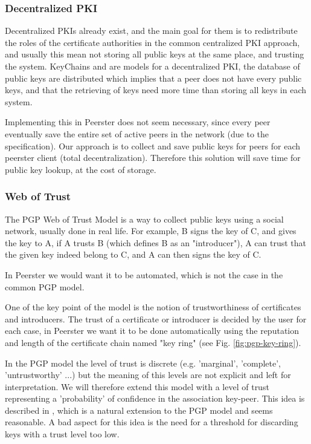 \documentclass[]{article}
\begin{document}
\subsubsection{Decentralized PKI}
Decentralized PKIs already exist, and the main goal for them is to redistribute the roles of the certificate authorities in the common centralized PKI approach, and usually this mean not storing all public keys at the same place, and trusting the system. KeyChains \cite{morselli2006keychains} and \cite{aberer2005decentralised} are models for a decentralized PKI, the database of public keys are distributed which implies that a peer does not have every public keys, and that the retrieving of keys need more time than storing all keys in each system.

Implementing this in Peerster does not seem necessary, since every peer eventually save the entire set of active peers in the network (due to the specification). Our approach is to collect and save public keys for peers for each peerster client (total decentralization). Therefore this solution will save time for public key lookup, at the cost of storage.

\subsubsection{Web of Trust}
\label{sec:related-work-wot}

The PGP Web of Trust Model \cite{abdul1997pgp} is a way to collect public keys using a social network, usually done in real life. For example, B signs the key of C, and gives the key to A, if A trusts B (which defines B as an "introducer"), A can trust that the given key indeed belong to C, and A can then signs the key of C. 

In Peerster we would want it to be automated, which is not the case in the common PGP model. 

One of the key point of the model is the notion of trustworthiness of certificates and introducers. The trust of a certificate or introducer is decided by the user for each case, in Peerster we want it to be done automatically using the reputation and length of the certificate chain named "key ring" (see Fig. \ref{fig:pgp-key-ring}).

In the PGP model the level of trust is discrete (e.g. 'marginal', 'complete', 'untrustworthy' ...) but the meaning of this levels are not explicit and left for interpretation. We will therefore extend this model with a level of trust representing a 'probability' of confidence in the association key-peer. This idea is described in \cite{haenni2007new}, which is a natural extension to the PGP model and seems reasonable.
A bad aspect for this idea is the need for a threshold for discarding keys with a trust level too low.
\end{document}
